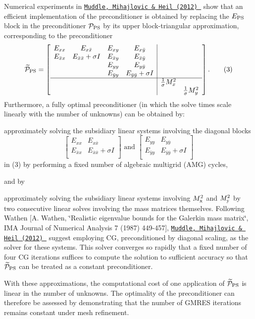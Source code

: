 Numerical experiments in \href{http://dx.doi.org/10.1016/j.jcp.2012.07.001}{\tt Muddle, Mihajlovic \& Heil (2012) } show that an efficient implementation of the preconditioner is obtained by replacing the $ E_{\rm PS} $ block in the preconditioner $ {\cal P}_{\rm PS} $ by its upper block-\/triangular approximation, corresponding to the preconditioner \[ \widetilde{\cal P}_{\rm PS}=\left[ \begin{array}{cccc|cc} E_{xx}&E_{x\bar{x}}&E_{xy}&E_{x\bar{y}}&&\\ E_{\bar{x}x}&E_{\bar{x}\bar{x}}+\sigma I&E_{\bar{x}y}&E_{\bar{x}\bar{y}}&&\\ &&E_{yy}&E_{y\bar{y}}&&\\ &&E_{\bar{y}y}&E_{\bar{y}\bar{y}}+\sigma I&&\\ \hline &&&&\frac{1}{\sigma}M_x^2&\\ &&&&&\frac{1}{\sigma}M_y^2\\ \end{array} \right]. \ \ \ \ \ \ (3) \] Furthermore, a fully optimal preconditioner (in which the solve times scale linearly with the number of unknowns) can be obtained by\+:
\begin{DoxyItemize}
\item approximately solving the subsidiary linear systems involving the diagonal blocks \[ \left[ \begin{array}{cc} E_{xx}&E_{x\bar{x}}\\ E_{\bar{x}x}&E_{\bar{x}\bar{x}}+\sigma I\\ \end{array} \right] \mbox{\ \ \ \ and\ \ \ \ \ } \left[ \begin{array}{cc} E_{yy}&E_{y\bar{y}}\\ E_{\bar{y}y}&E_{\bar{y}\bar{y}}+\sigma I\\ \end{array} \right] \] in (3) by performing a fixed number of algebraic multigrid (A\+MG) cycles,
\end{DoxyItemize}and by
\begin{DoxyItemize}
\item approximately solving the subsidiary linear systems involving $ M_{\rm x}^2 $ and $ M_{\rm y}^2 $ by two consecutive linear solves involving the mass matrices themselves. Following Wathen \mbox{[}A. Wathen, \char`\"{}\+Realistic eigenvalue bounds for the Galerkin mass matrix\char`\"{}, I\+MA Journal of Numerical Analysis 7 (1987) 449-\/457\mbox{]}, \href{http://dx.doi.org/10.1016/j.jcp.2012.07.001}{\tt Muddle, Mihajlovic \& Heil (2012) } suggest employing CG, preconditioned by diagonal scaling, as the solver for these systems. This solver converges so rapidly that a fixed number of four CG iterations suffices to compute the solution to sufficient accuracy so that $ \widetilde{\cal P}_{\rm PS} $ can be treated as a constant preconditioner.
\end{DoxyItemize}With these approximations, the computational cost of one application of $ \widetilde{\cal P}_{\rm PS} $ is linear in the number of unknowns. The optimality of the preconditioner can therefore be assessed by demonstrating that the number of G\+M\+R\+ES iterations remains constant under mesh refinement.



